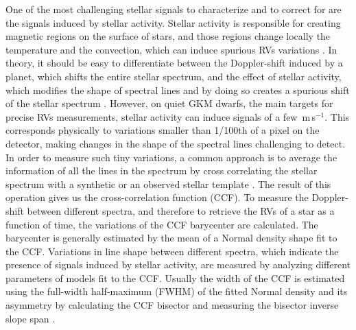 \documentclass{aa}
\def\ms{\hbox{\,m\,s$^{-1}$}}         %
\begin{document}
One of the most challenging stellar signals to characterize and to correct for are the signals induced by stellar activity. 
Stellar activity is responsible for creating magnetic regions on the surface of stars, and those regions change locally the temperature and the convection, which can induce spurious RVs variations \citep[e.g.][]{Meunier-2010a, Dumusque-2014b, Borgniet-2015}. 
In theory, it should be easy to differentiate between the Doppler-shift induced by a planet, which shifts the entire stellar spectrum, and the effect of stellar activity, which modifies the shape of spectral lines and by doing so creates a spurious shift of the stellar spectrum \citep{Saar-1997b,Hatzes-2002,Kurster2003,Lindegren-2003,Desort-2007,Lagrange-2010,Meunier-2010a,Dumusque-2014b}. 
However, on quiet GKM dwarfs, the main targets for precise RVs measurements, stellar activity can induce signals of a few \ms. 
This corresponds physically to variations smaller than 1/100th of a pixel on the detector, making changes in the shape of the spectral lines challenging to detect.
In order to measure such tiny variations, a common approach is to average the information of all the lines in the spectrum by cross correlating the stellar spectrum with a synthetic or an observed stellar template \citep[][]{Baranne-1996,Pepe-2002a, Anglada-Escude-2012}. The result of this operation gives us the cross-correlation function (CCF).  
%
To measure the Doppler-shift between different spectra, and therefore to retrieve the RVs of a star as a function of time, the variations of the CCF barycenter are calculated. 
The barycenter is generally estimated by the mean of  a Normal density shape fit to the CCF. 
Variations in line shape between different spectra, which indicate the presence of signals induced by stellar activity, are measured by analyzing different parameters of models fit to the CCF. Usually the width of the CCF is estimated using the full-width half-maximum (FWHM) of the fitted Normal density and its asymmetry by calculating the CCF bisector and measuring the bisector inverse slope span \citep[BIS SPAN,][]{Queloz-2001}.

\end{document}
